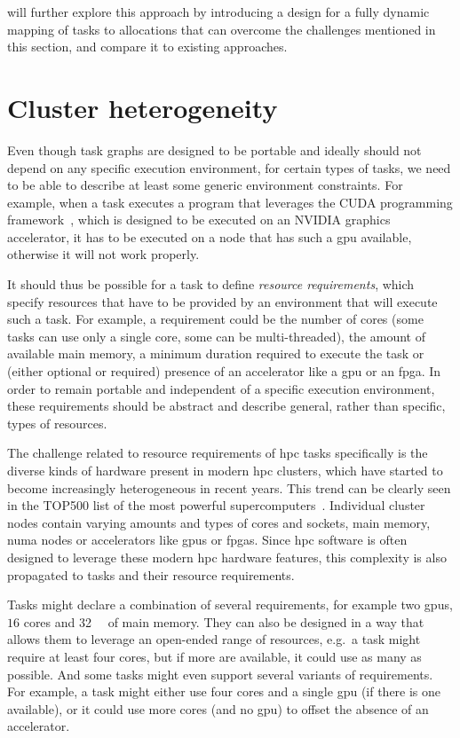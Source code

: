  will further explore this approach by introducing a design for a fully
dynamic mapping of tasks to allocations that can overcome the challenges mentioned in this section,
and compare it to existing approaches.

\section{Cluster heterogeneity}
Even though task graphs are designed to be portable and ideally should not depend on any specific
execution environment, for certain types of tasks, we need to be able to describe at least some
generic environment constraints. For example, when a task executes a program that leverages the
CUDA programming framework~\cite{cuda}, which is designed to be executed on an
NVIDIA graphics accelerator, it has to be executed on a node that has such a
\gls{gpu} available, otherwise it will not work properly.

It should thus be possible for a task to define \emph{resource requirements}, which specify
resources that have to be provided by an environment that will execute such a task. For example, a
requirement could be the number of cores (some tasks can use only a single core, some can be
multi-threaded), the amount of available main memory, a minimum duration required to execute the
task or (either optional or required) presence of an accelerator like a \gls{gpu}
or an \gls{fpga}. In order to remain portable and independent of a specific
execution environment, these requirements should be abstract and describe general, rather than
specific, types of resources.

The challenge related to resource requirements of \gls{hpc} tasks specifically is
the diverse kinds of hardware present in modern \gls{hpc} clusters, which have
started to become increasingly heterogeneous in recent years. This trend can be clearly seen in the
TOP500 list of the most powerful supercomputers~\cite{top500analysis}. Individual cluster
nodes contain varying amounts and types of cores and sockets, main memory,
\gls{numa} nodes or accelerators like \glspl{gpu} or
\glspl{fpga}. Since \gls{hpc} software is often designed to
leverage these modern \gls{hpc} hardware features, this complexity is also
propagated to tasks and their resource requirements.

Tasks might declare a combination of several requirements, for example two
\glspl{gpu}, $16$ cores and \SI{32}{\gibi\byte} of
main memory. They can also be designed in a way that allows them to leverage an open-ended range of
resources, e.g.\ a task might require at least four cores, but if more are available, it could use
as many as possible. And some tasks might even support several variants of requirements. For
example, a task might either use four cores and a single \gls{gpu} (if there is one available), or it could
use more cores (and no \gls{gpu}) to offset the absence of an accelerator.

